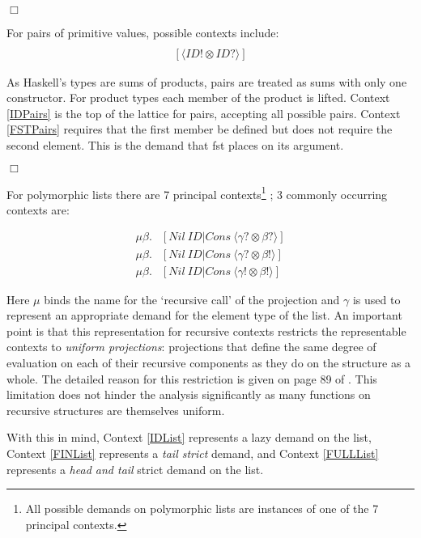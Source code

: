 \hfill$\Box$

For pairs of primitive values, possible contexts include:
\begin{align}
[\langle ID? \otimes ID? \rangle] \label{IDPairs} \\
[\langle ID! \otimes ID? \rangle] \label{FSTPairs}
\end{align}


As Haskell's types are sums of products, pairs are treated as sums with only
one constructor.  For product types each member of the product is lifted.
Context \ref{IDPairs} is the top of the lattice for pairs, accepting all
possible pairs. Context \ref{FSTPairs} requires that the first member be
defined but does not require the second element. This is the demand that
\<fst\> places on its argument.

\hfill$\Box$

For polymorphic lists there are 7 principal contexts\footnote{All possible
demands on polymorphic lists are instances of one of the 7 principal contexts.}
\citep{hinze1995projection}; 3 commonly occurring contexts are:

\begin{align}
    \mu\beta.&[Nil\ ID | Cons\ \langle \gamma? \otimes \beta?\rangle] \label{IDList} \\
    \mu\beta.&[Nil\ ID | Cons\ \langle \gamma? \otimes \beta!\rangle] \label{FINList} \\
    \mu\beta.&[Nil\ ID | Cons\ \langle \gamma! \otimes \beta!\rangle] \label{FULLList}
\end{align}


Here $\mu$ binds the name for the `recursive call' of the projection and
$\gamma$ is used to represent an appropriate demand for the element type of the
list.  An important point is that this representation for recursive contexts
restricts the representable contexts to \emph{uniform projections}: projections
that define the same degree of evaluation on each of their recursive components
as they do on the structure as a whole. The detailed reason for this
restriction is given on page 89 of \cite{hinze1995projection}. This limitation
does not hinder the analysis significantly as many functions on recursive
structures are themselves uniform.

With this in mind, Context \ref{IDList} represents a lazy demand on the list,
Context \ref{FINList} represents a \emph{tail strict} demand, and Context
\ref{FULLList} represents a \emph{head and tail} strict demand on the list.

